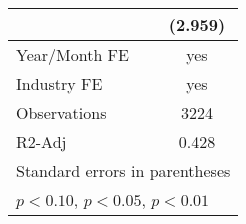 \begin{table}[htbp]
\begin{tabular}{l*{1}{c}}
                    &     (2.959)         \\
\hline
Year/Month FE       &         yes         \\
Industry FE         &         yes         \\
Observations        &        3224         \\
R2-Adj              &       0.428         \\
\hline\hline
\multicolumn{2}{l}{\footnotesize Standard errors in parentheses}\\
\multicolumn{2}{l}{\footnotesize \sym{*} \(p<0.10\), \sym{**} \(p<0.05\), \sym{***} \(p<0.01\)}\\
\end{tabular}
\end{table}
